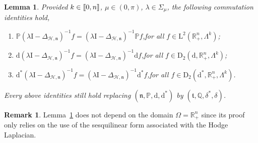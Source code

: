 \documentclass[10pt]{amsart}
\newtheorem{lemm}[theo]{Lemma}\newtheorem{prop}[theo]{Proposition}\newtheorem{coro}[theo]{Corollary}\newtheorem{conj}[theo]{Conjecture}
\theoremstyle{definition}\newtheorem{defi}[theo]{Definition}\newtheorem{rema}[theo]{Remark}\newtheorem{exam}[theo]{Example}\newtheorem{exem}[theo]{Example}\newtheorem{nota}[theo]{Notation}
\newcommand{\bbP}{\mathbb{P}}
\newcommand{\bbR}{\mathbb{R}}
\newcommand{\bbQ}{\mathbb{Q}}
\newcommand{\rmd}{\mathrm{d}}
\newcommand{\rmD}{\mathrm{D}}
\newcommand{\rmL}{\mathrm{L}}
\newcommand{\rmI}{\mathrm{I}}
\newcommand{\clH}{\mathcal{H}}
\newcommand{\fkn}{\mathfrak{n}}
\newcommand{\fkt}{\mathfrak{t}}
\newcommand{\llbracket}{\mathopen{[\mkern -2.7mu[}}
\newcommand{\rrbracket}{\mathclose{]\mkern -2.7mu]}}
\newcommand{\llb}{\llbracket}
\newcommand{\rrb}{\rrbracket}
\begin{document}
\begin{lemm}\label{lem:commutrelationL2HodgeRn+}
Provided $k\in\llb 0,n\rrb$, $\mu\in(0,\pi)$, $\lambda\in\Sigma_\mu$, the following commutation identities hold,
\begin{enumerate}
\item $\bbP(\lambda \rmI  - \Delta_{\clH,\fkn})^{-1}f = (\lambda \rmI  - \Delta_{\clH,\fkn})^{-1}\bbP f$,\qquad for all $f\in\rmL^2(\bbR^n_+,\Lambda^k)$;
\item $\rmd(\lambda \rmI  - \Delta_{\clH,\fkn})^{-1}f = (\lambda \rmI  - \Delta_{\clH,\fkn})^{-1}\rmd f$,\qquad for all $f\in\rmD_2(\rmd,\bbR^n_+,\Lambda^k)$;
\item $\rmd^\ast(\lambda \rmI  - \Delta_{\clH,\fkn})^{-1}f = (\lambda \rmI  - \Delta_{\clH,\fkn})^{-1}\rmd^\ast f$,\qquad for all $f\in\rmD_2(\rmd^\ast,\bbR^n_+,\Lambda^k)$.
\end{enumerate}
Every above identities still hold replacing $(\fkn,\bbP,\rmd,\rmd^\ast)$ by $(\fkt,\bbQ,\delta^\ast,\delta)$.
\end{lemm}

\begin{rema}
Lemma~\ref{lem:commutrelationL2HodgeRn+} does not depend on the domain $\Omega=\bbR^n_+$ since its proof only relies on the use of the sesquilinear form associated with the Hodge Laplacian.
\end{rema}
\end{document}
